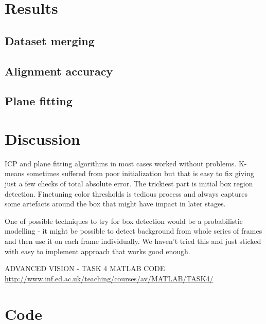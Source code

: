 \documentclass{article}
\begin{document}
\section{Results}

\subsection{Dataset merging}

\subsection{Alignment accuracy}

\subsection{Plane fitting}

\section{Discussion}
ICP and plane fitting algorithms in most cases 
worked without problems. K-means sometimes suffered
from poor initialization but that is easy to 
fix giving just a few checks of total
absolute error. The trickiest part is initial box
region detection. Finetuning color thresholds is tedious
process and always captures some artefacts around the box
that might have impact in later stages.

One of possible techniques to try for box detection
would be a probabilistic modelling - it might be possible
to detect background from whole series of frames
and then use it on each frame individually. 
We haven't tried this and just sticked with
easy to implement approach that works good enough.

\begin{thebibliography}{9}
  
  ADVANCED VISION - TASK 4 MATLAB CODE
  \url{http://www.inf.ed.ac.uk/teaching/courses/av/MATLAB/TASK4/} 
  
\end{thebibliography}

\appendix


\newpage

\newpage
\section{Code}
\label{apen:code_in}

%
\end{document}
